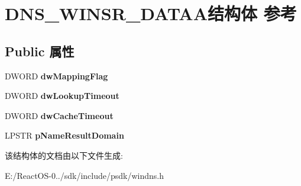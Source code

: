 \hypertarget{struct_d_n_s___w_i_n_s_r___d_a_t_a_a}{}\section{D\+N\+S\+\_\+\+W\+I\+N\+S\+R\+\_\+\+D\+A\+T\+A\+A结构体 参考}
\label{struct_d_n_s___w_i_n_s_r___d_a_t_a_a}
\subsection*{Public 属性}
\begin{DoxyCompactItemize}
\item 
\mbox{\label{struct_d_n_s___w_i_n_s_r___d_a_t_a_a_aa295ca83a423565bb49a3f3192641205}} 
D\+W\+O\+RD {\bfseries dw\+Mapping\+Flag}
\item 
\mbox{\label{struct_d_n_s___w_i_n_s_r___d_a_t_a_a_a7f1470dfa958d5232de3ee81f1bba4f9}} 
D\+W\+O\+RD {\bfseries dw\+Lookup\+Timeout}
\item 
\mbox{\label{struct_d_n_s___w_i_n_s_r___d_a_t_a_a_aac5e13ca261843433b5332427b0883ef}} 
D\+W\+O\+RD {\bfseries dw\+Cache\+Timeout}
\item 
\mbox{\label{struct_d_n_s___w_i_n_s_r___d_a_t_a_a_a17da24da54e3097e141cba6e090efbb1}} 
L\+P\+S\+TR {\bfseries p\+Name\+Result\+Domain}
\end{DoxyCompactItemize}


该结构体的文档由以下文件生成\+:\begin{DoxyCompactItemize}
\item 
E\+:/\+React\+O\+S-\/0../sdk/include/psdk/windns.\+h\end{DoxyCompactItemize}
